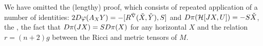 \begin{myproof}
	We have omitted the (lengthy) proof, which consists of repeated application of a number of identities: $2D\varphi(A_XY)=-[R^{\check\nabla}(\check X,\check Y),S]$ and $D\pi(\mathcal{H}[JX,U])=-S\check X$, the , the fact that $D\pi(JX)=SD\pi(X)$ for any horizontal $X$ and the relation $r=(n+2)g$ between the Ricci and metric tensors of $M$.
%			

\end{myproof}

